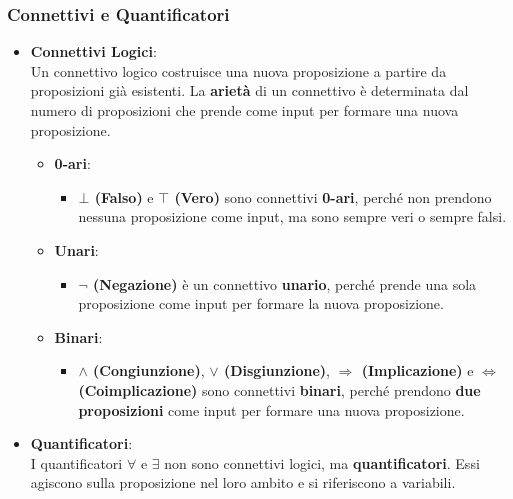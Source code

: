 \documentclass[
  a4paper,
]{article}
\providecommand{\tightlist}{%
  \setlength{\itemsep}{0pt}\setlength{\parskip}{0pt}}
\begin{document}
\hypertarget{connettivi-e-quantificatori}{%
\subsubsection{Connettivi e
Quantificatori}\label{connettivi-e-quantificatori}}

\begin{itemize}
\item
  \textbf{Connettivi Logici}:\\
  Un connettivo logico costruisce una nuova proposizione a partire da
  proposizioni già esistenti. La \textbf{arietà} di un connettivo è
  determinata dal numero di proposizioni che prende come input per
  formare una nuova proposizione.

  \begin{itemize}
  \tightlist
  \item
    \textbf{0-ari}:

    \begin{itemize}
    \tightlist
    \item
      \textbf{\(\bot\) (Falso)} e \textbf{\(\top\) (Vero)} sono
      connettivi \textbf{0-ari}, perché non prendono nessuna
      proposizione come input, ma sono sempre veri o sempre falsi.
    \end{itemize}
  \item
    \textbf{Unari}:

    \begin{itemize}
    \tightlist
    \item
      \textbf{\(\neg\) (Negazione)} è un connettivo \textbf{unario},
      perché prende una sola proposizione come input per formare la
      nuova proposizione.
    \end{itemize}
  \item
    \textbf{Binari}:

    \begin{itemize}
    \tightlist
    \item
      \textbf{\(\land\) (Congiunzione)}, \textbf{\(\lor\)
      (Disgiunzione)}, \textbf{\(\Rightarrow\) (Implicazione)} e
      \textbf{\(\iff\) (Coimplicazione)} sono connettivi
      \textbf{binari}, perché prendono \textbf{due proposizioni} come
      input per formare una nuova proposizione.
    \end{itemize}
  \end{itemize}
\item
  \textbf{Quantificatori}:\\
  I quantificatori \(\forall\) e \(\exists\) non sono connettivi logici,
  ma \textbf{quantificatori}. Essi agiscono sulla proposizione nel loro
  ambito e si riferiscono a variabili.
\end{itemize}
\end{document}
